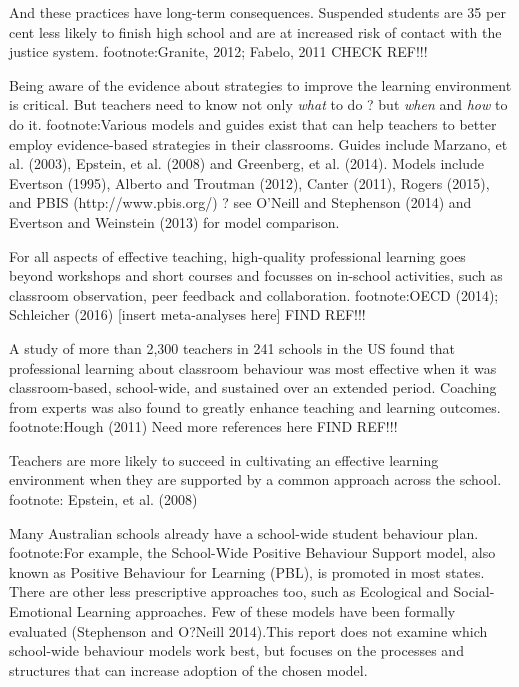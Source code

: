And these practices have long-term consequences. Suspended students are 35 per cent less likely to finish high school and are at increased risk of contact with the justice system.  footnote:Granite, 2012; Fabelo, 2011 CHECK REF!!!

Being aware of the evidence about strategies to improve the learning environment is critical. But teachers need to know not only \emph{what} to do ? but \emph{when} and \emph{how} to do it. footnote:Various models and guides exist that can help teachers to better employ evidence-based strategies in their classrooms. Guides include Marzano, et al. (2003), Epstein, et al. (2008) and Greenberg, et al. (2014). Models include  Evertson (1995), Alberto and Troutman (2012), Canter (2011), Rogers (2015), and PBIS (http://www.pbis.org/) ? see O'Neill and Stephenson (2014) and Evertson and Weinstein (2013) for model comparison.

%

For all aspects of effective teaching, high-quality professional learning goes beyond workshops and short courses and focusses on in-school activities, such as classroom observation, peer feedback and collaboration. footnote:OECD (2014); Schleicher (2016) [insert meta-analyses here] FIND REF!!!

A study of more than 2,300 teachers in 241 schools in the US found that professional learning about classroom behaviour was most effective when it was classroom-based, school-wide, and sustained over an extended period. Coaching from experts was also found to greatly enhance teaching and learning outcomes.  footnote:Hough (2011)  Need more references here FIND REF!!!

Teachers are more likely to succeed in cultivating an effective learning environment when they are supported by a common approach across the school. footnote: Epstein, et al. (2008)

Many Australian schools already have a school-wide student behaviour plan. footnote:For example, the School-Wide Positive Behaviour Support model, also known as Positive Behaviour for Learning (PBL), is promoted in most states. There are other less prescriptive approaches too, such as Ecological and Social-Emotional Learning approaches. Few of these models have been formally evaluated (Stephenson and O?Neill 2014).This report does not examine which school-wide behaviour models work best, but focuses on the processes and structures that can increase adoption of the chosen model. 

